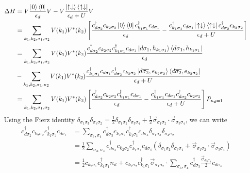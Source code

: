 \begin{equation}\begin{aligned}
\Delta H &= V\frac{\ket{0}\bra{0}}{\epsilon_d}V - V\frac{\ket{\uparrow\downarrow}\bra{\uparrow\downarrow}}{\epsilon_d + U}V\\
	 &= \sum_{k_1,k_2,\sigma_1,\sigma_2}V(k_1)V^*(k_2)\left[\frac{c^\dagger_{d\sigma_2} c_{k_2 \sigma_2}\ket{0}\bra{0}c^\dagger_{k_1\sigma_1} c_{d \sigma_1}}{\epsilon_d} - \frac{c^\dagger_{k_1\sigma_1} c_{d \sigma_1}\ket{\uparrow\downarrow}\bra{\uparrow\downarrow}c^\dagger_{d\sigma_2} c_{k_2 \sigma_2}}{\epsilon_d+U}\right]\\
&=\sum_{k_1,k_2,\sigma_1,\sigma_2}V(k_1)V^*(k_2)\frac{c^\dagger_{d\sigma_2} c_{k_2 \sigma_2}c^\dagger_{k_1\sigma_1} c_{d \sigma_1}\ket{d\sigma_1,h_{k_1\sigma_1}}\bra{d\sigma_1,h_{k_1\sigma_1}}}{\epsilon_d} \\
&- \sum_{k_1,k_2,\sigma_1,\sigma_2}V(k_1)V^*(k_2)\frac{c^\dagger_{k_1\sigma_1} c_{d \sigma_1}c^\dagger_{d\sigma_2} c_{k_2 \sigma_2}\ket{d\overline{\sigma_2},e_{k_2\sigma_2}}\bra{d\overline{\sigma_2},e_{k_2\sigma_2}}}{\epsilon_d+U}\\
&=\sum_{k_1,k_2,\sigma_1,\sigma_2}V(k_1)V^*(k_2)\left[\frac{c^\dagger_{d\sigma_2} c_{k_2 \sigma_2}c^\dagger_{k_1\sigma_1} c_{d \sigma_1}}{\epsilon_d} - \frac{c^\dagger_{k_1\sigma_1} c_{d \sigma_1}c^\dagger_{d\sigma_2} c_{k_2 \sigma_2}}{\epsilon_d+U}\right]P_{n_d=1}
\end{aligned}\end{equation}
Using the Fierz identity \(\delta_{\sigma_1\sigma_3}\delta_{\sigma_4\sigma_2} = \frac{1}{2}\delta_{\sigma_1\sigma_2}\delta_{\sigma_3\sigma_4} + \frac{1}{2}\vec\sigma_{\sigma_1\sigma_2}\cdot\vec\sigma_{\sigma_3\sigma_4}\), we can write
\begin{equation}\begin{aligned}
c^\dagger_{d\sigma_2} c_{k_2 \sigma_2}c^\dagger_{k_1\sigma_1} c_{d \sigma_1} &= \sum_{\sigma_3,\sigma_4}c^\dagger_{d\sigma_3} c_{k_2 \sigma_2}c^\dagger_{k_1\sigma_1} c_{d \sigma_4}\delta_{\sigma_1\sigma_3}\delta_{\sigma_4\sigma_2}\\
									     &=\frac{1}{2}\sum_{\sigma_3,\sigma_4}c^\dagger_{d\sigma_3} c_{k_2 \sigma_2}c^\dagger_{k_1\sigma_1} c_{d \sigma_4}\left(\delta_{\sigma_1\sigma_2}\delta_{\sigma_3\sigma_4} + \vec\sigma_{\sigma_1\sigma_2}\cdot\vec\sigma_{\sigma_3\sigma_4}\right)\\
&=\frac{1}{2} c_{k_2 \sigma_1}c^\dagger_{k_1\sigma_1}n_d+c_{k_2 \sigma_2}c^\dagger_{k_1\sigma_1}\vec\sigma_{\sigma_1\sigma_2}\cdot\sum_{\sigma_3,\sigma_4}c^\dagger_{d\sigma_3}\frac{\vec \sigma_{\sigma_3\sigma_4}}{2}c_{d\sigma_4}
\end{aligned}\end{equation}
